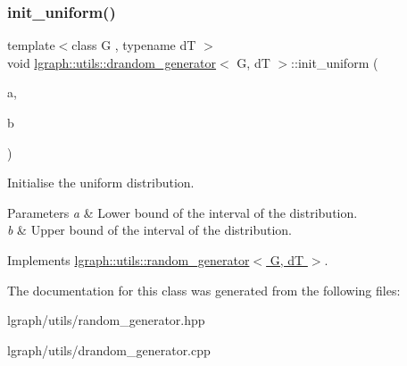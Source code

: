 \subsubsection{\texorpdfstring{init\+\_\+uniform()}{init\_uniform()}}
{\footnotesize\ttfamily template$<$class G , typename dT $>$ \\
void \hyperlink{classlgraph_1_1utils_1_1drandom__generator}{lgraph\+::utils\+::drandom\+\_\+generator}$<$ G, dT $>$\+::init\+\_\+uniform (\begin{DoxyParamCaption}\item[{dT}]{a,  }\item[{dT}]{b }\end{DoxyParamCaption})\hspace{0.3cm}{\ttfamily [virtual]}}



Initialise the uniform distribution. 


\begin{DoxyParams}{Parameters}
{\em a} & Lower bound of the interval of the distribution. \\
\hline
{\em b} & Upper bound of the interval of the distribution. \\
\hline
\end{DoxyParams}


Implements \hyperlink{classlgraph_1_1utils_1_1random__generator_a129da597bed5b08e9c7e5a3ddce4287c}{lgraph\+::utils\+::random\+\_\+generator$<$ G, d\+T $>$}.



The documentation for this class was generated from the following files\+:\begin{DoxyCompactItemize}
\item 
lgraph/utils/random\+\_\+generator.\+hpp\item 
lgraph/utils/drandom\+\_\+generator.\+cpp\end{DoxyCompactItemize}
